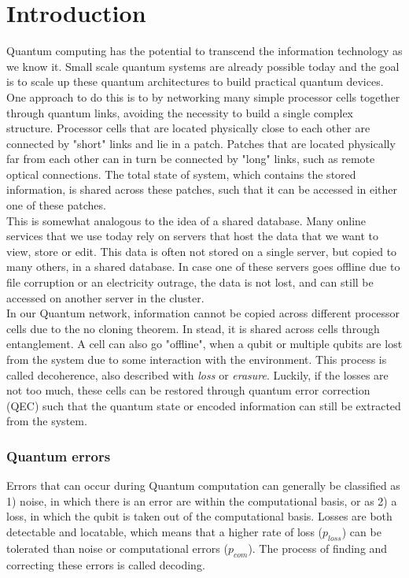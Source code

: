 \chapter{Introduction}


Quantum computing has the potential to transcend the information technology as we know it. Small scale quantum systems are already possible today and the goal is to scale up these quantum architectures to build practical quantum devices. One approach to do this is to by networking many simple processor cells together through quantum links, avoiding the necessity to build a single complex structure. Processor cells that are located physically close to each other are connected by "short" links and lie in a patch. Patches that are located physically far from each other can in turn be connected by "long" links, such as remote optical connections. The total state of system, which contains the stored information, is shared across these patches, such that it can be accessed in either one of these patches. \\

This is somewhat analogous to the idea of a shared database. Many online services that we use today rely on servers that host the data that we want to view, store or edit. This data is often not stored on a single server, but copied to many others, in a shared database. In case one of these servers goes offline due to file corruption or an electricity outrage, the data is not lost, and can still be accessed on another server in the cluster.\\

In our Quantum network, information cannot be copied across different processor cells due to the no cloning theorem. In stead, it is shared across cells through entanglement. A cell can also go "offline", when a qubit or multiple qubits are lost from the system due to some interaction with the environment. This process is called decoherence, also described with \emph{loss} or \emph{erasure}. Luckily, if the losses are not too much, these cells can be restored through quantum error correction (QEC) such that the quantum state or encoded information can still be extracted from the system. \\

\subsection{Quantum errors}
Errors that can occur during Quantum computation can generally be classified as 1) noise, in which there is an error are within the computational basis, or as 2) a loss, in which the qubit is
taken out of the computational basis. Losses are both detectable and locatable, which means that a higher rate of loss ($p_{loss}$) can be tolerated than noise or computational errors ($p_{com}$). The process of finding and correcting these errors is called decoding. \\

